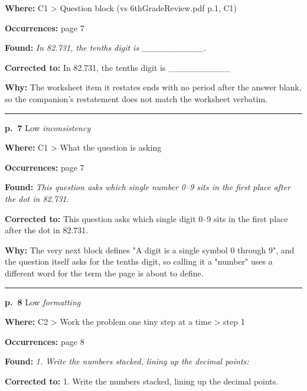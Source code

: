 \documentclass[11pt]{article}
\newcommand{\sevlow}[1]{\textcolor{black!55}{#1}}
\begin{document}
\noindent\textbf{Where: }C1 > Question block (vs 6thGradeReview.pdf p.1, C1)\par
\noindent\textbf{Occurrences: }page 7\par
\noindent\textbf{Found: }\textit{In 82.731, the tenths digit is \_\_\_\_\_\_\_\_\_\_.}\par
\noindent\textbf{Corrected to: }In 82.731, the tenths digit is \_\_\_\_\_\_\_\_\_\_\par
\noindent\textbf{Why: }The worksheet item it restates ends with no period after the answer blank, so the companion's restatement does not match the worksheet verbatim.\par\vspace{4pt}
\noindent\rule{\textwidth}{0.4pt}\par\nobreak\vspace{2pt}
\noindent\textbf{p.~7} \quad \sevlow{Low} \quad \textit{inconsistency}\par
\noindent\textbf{Where: }C1 > What the question is asking\par
\noindent\textbf{Occurrences: }page 7\par
\noindent\textbf{Found: }\textit{This question asks which single number 0--9 sits in the first place after the dot in 82.731.}\par
\noindent\textbf{Corrected to: }This question asks which single digit 0--9 sits in the first place after the dot in 82.731.\par
\noindent\textbf{Why: }The very next block defines "A digit is a single symbol 0 through 9", and the question itself asks for the tenths digit, so calling it a "number" uses a different word for the term the page is about to define.\par\vspace{4pt}
\noindent\rule{\textwidth}{0.4pt}\par\nobreak\vspace{2pt}
\noindent\textbf{p.~8} \quad \sevlow{Low} \quad \textit{formatting}\par
\noindent\textbf{Where: }C2 > Work the problem one tiny step at a time > step 1\par
\noindent\textbf{Occurrences: }page 8\par
\noindent\textbf{Found: }\textit{1. Write the numbers stacked, lining up the decimal points:}\par
\noindent\textbf{Corrected to: }1. Write the numbers stacked, lining up the decimal points.\par
\end{document}
